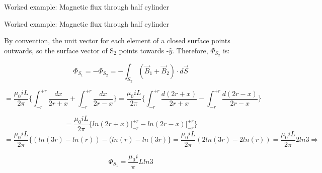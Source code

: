 {\begin{frame}{Worked example: Magnetic flux through half cylinder}
\end{frame}

%
%
%

\begin{frame}{Worked example: Magnetic flux through half cylinder}

  By convention, the unit vector for each element of a closed surface points outwards,
  so the surface vector of S$_2$ points towards -$\hat{y}$.
  Therefore, $\Phi_{S_2}$ is:

  \begin{equation*}
  	\Phi_{S_1} =
  	- \Phi_{S_2} =
  	- \int_{S_2} (\vec{B}_1 + \vec{B}_2) \cdot d\vec{S}
  \end{equation*}

  \begin{equation*}
  	= \frac{\mu_0 i L}{2\pi}
  	   \big\{
  		   \int_{-r}^{+r} \frac{dx}{2r+x} +
  			 \int_{-r}^{+r} \frac{dx}{2r-x}
  	   \big\}
    = \frac{\mu_0 i L}{2\pi}
  	   \big\{
  		   \int_{-r}^{+r} \frac{d(2r+x)}{2r+x} -
  			 \int_{-r}^{+r} \frac{d(2r-x)}{2r-x}
  	   \big\}
  \end{equation*}

  \begin{equation*}
  	=
  	   \frac{\mu_0 i L}{2\pi}
  	   \big\{
  		   ln(2r+x) \rvert_{-r}^{+r} -
  			 ln(2r-x) \rvert_{-r}^{+r}
  	   \big\}
  \end{equation*}
  \begin{equation*}
  	=
  		 \frac{\mu_0 i L}{2\pi}
  		 \big\{
  		   (ln(3r) - ln(r)) -
  			 (ln(r) - ln(3r)
  	   \big\}
  	= \frac{\mu_0 i L}{2\pi}
  		  (2ln(3r) - 2ln(r))
    = \frac{\mu_0 i L}{2\pi} 2 ln3 \Rightarrow
  \end{equation*}

  \begin{equation*}
  	\Phi_{S_1} =
  	    \frac{\mu_0 i}{\pi} L ln3
  \end{equation*}




\end{frame}}
